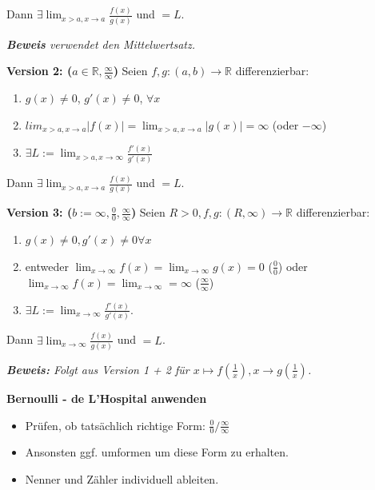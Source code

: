 Dann $\exists \lim_{x>a, x \rightarrow a} \frac{f(x)}{g(x)}$ und $=L$.

\textit{\textbf{Beweis} verwendet den Mittelwertsatz.}

\textbf{Version 2: ($a \in \mathbb{R}, \frac{\infty}{\infty}$)}
Seien $f,g:(a,b) \rightarrow \mathbb{R}$ differenzierbar:
\begin{enumerate}
    \item $g(x) \neq 0$, $g'(x) \neq 0$, $\forall x$
    \item $lim_{x > a, x \rightarrow a}|f(x)| = \lim_{x>a, x \rightarrow a}|g(x)| = \infty$ (oder $- \infty$)
    \item $\exists L:=\lim_{x>a, x \rightarrow \infty}\frac{f'(x)}{g'(x)}$
\end{enumerate}

Dann $\exists \lim_{x>a, x \rightarrow a} \frac{f(x)}{g(x)}$ und $=L$.

\textbf{Version 3: ($b:= \infty, \frac{0}{0}, \frac{\infty}{\infty}$)}
Seien $R>0, f,g:(R,\infty) \rightarrow \mathbb{R}$ differenzierbar:
\begin{enumerate}
    \item $g(x) \neq 0, g'(x) \neq 0 \forall x$
    \item entweder $\lim_{x \rightarrow \infty} f(x) = \lim_{x \rightarrow \infty} g(x) = 0$ ($\frac{0}{0}$)
        oder $\lim_{x \rightarrow \infty} f(x) = \lim_{x \rightarrow \infty} = \infty$ ($\frac{\infty}{\infty}$)
    \item $\exists L:= \lim_{x \rightarrow \infty} \frac{f'(x)}{g'(x)}$.
\end{enumerate}

Dann $\exists \lim_{x \rightarrow \infty} \frac{f(x)}{g(x)}$ und $=L$.

\textit{\textbf{Beweis:} Folgt aus Version 1 + 2 für $x \mapsto f(\frac{1}{x}), x \rightarrow g(\frac{1}{x})$.}

\begin{exercise}
    \textbf{Bernoulli - de L'Hospital anwenden}

    \begin{itemize}
        \item Prüfen, ob tatsächlich richtige Form: $\frac{0}{0} / \frac{\infty}{\infty}$
        \item Ansonsten ggf. umformen um diese Form zu erhalten.
        \item Nenner und Zähler individuell ableiten.
    \end{itemize}
\end{exercise}

